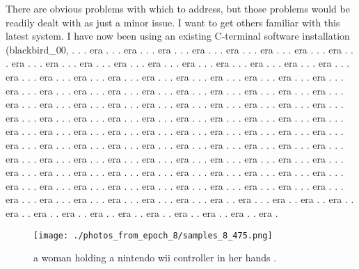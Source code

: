 \documentclass{article}%
\begin{document}
There are obvious problems with which to address, but those problems would be readily dealt with as just a minor issue. I want to get others familiar with this latest system. I have now been using an existing C{-}terminal software installation (blackbird\_00, . . . era . . . era . . . era . . . era . . . era . . . era . . . era . . . era . . . era . . . era . . . era . . . era . . . era . . . era . . . era . . . era . . . era . . . era . . . era . . . era . . . era . . . era . . . era . . . era . . . era . . . era . . . era . . . era . . . era . . . era . . . era . . . era . . . era . . . era . . . era . . . era . . . era . . . era . . . era . . . era . . . era . . . era . . . era . . . era . . . era . . . era . . . era . . . era . . . era . . . era . . . era . . . era . . . era . . . era . . . era . . . era . . . era . . . era . . . era . . . era . . . era . . . era . . . era . . . era . . . era . . . era . . . era . . . era . . . era . . . era . . . era . . . era . . . era . . . era . . . era . . . era . . . era . . . era . . . era . . . era . . . era . . . era . . . era . . . era . . . era . . . era . . . era . . . era . . . era . . . era . . . era . . . era . . . era . . . era . . . era . . . era . . . era . . . era . . . era . . . era . . . era . . . era . . . era . . . era . . . era . . . era . . . era . . . era . . . era . . . era . . . era . . . era . . . era . . . era . . . era . . era . . . era . . era . . era . . era . . era . . era . . era . . era . . era . . era . . era . . era . . era .

%


\begin{figure}[h!]%
\centering%
\texttt{[image: ./photos\_from\_epoch\_8/samples\_8\_475.png]}%
\caption{a woman holding a nintendo wii controller in her hands .}%
\end{figure}

%
\end{document}
